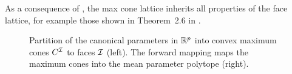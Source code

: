 As a consequence of , the max cone lattice inherits all properties of the face lattice, for example those shown in Theorem~2.6 in \cite{ziegler_lectures_2013}.

\begin{figure}
    \begin{center}
        
    \end{center}
    \caption{
        Partition of the canonical parameters in $\mathbb{R}^{p}$ into convex maximum cones $C^{\mathcal{I}}$ to faces $\mathcal{I}$ (left).
        The forward mapping maps the maximum cones into the mean parameter polytope (right).
    }\label{fig:max_cone_sketch}
\end{figure}


